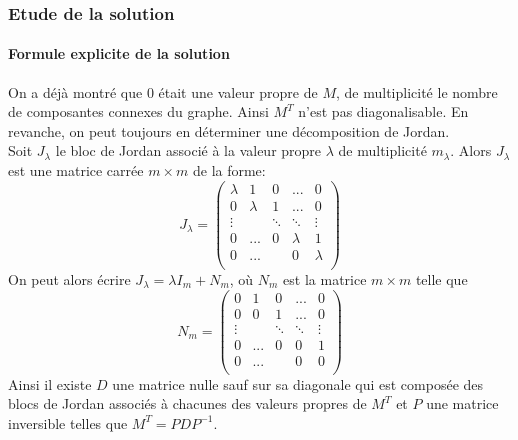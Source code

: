\documentclass[a4paper]{article}
\theoremstyle{plain}
\theoremstyle{definition}
\theoremstyle{remark}
\begin{document}
\subsubsection{Etude de la solution}
\paragraph{Formule explicite de la solution}
On a déjà montré que $0$ était une valeur propre de $M$, de multiplicité le nombre de composantes connexes du graphe. Ainsi $M^T$ n'est pas diagonalisable. En revanche, on peut toujours en déterminer une décomposition de Jordan.\\
Soit $J_\lambda$ le bloc de Jordan associé à la valeur propre $\lambda$ de multiplicité $m_\lambda$. Alors $J_\lambda$ est une matrice carrée $m\times m$ de la forme:
$$J_\lambda=\begin{pmatrix}
 \lambda& 1 &0& ... & 0\\
 0 & \lambda&1& ...&0\\
 \vdots&&\ddots&\ddots&\vdots\\
 0&...&0&\lambda&1\\
 0&...&&0&\lambda\\
\end{pmatrix}$$
On peut alors écrire $J_\lambda=\lambda I_m+N_m$, où $N_m$ est la matrice $m\times m$ telle que 
$$N_m=\begin{pmatrix}
 0& 1 &0& ... & 0\\
 0 & 0&1& ...&0\\
 \vdots&&\ddots&\ddots&\vdots\\
 0&...&0&0&1\\
 0&...&&0&0\\
\end{pmatrix}$$
Ainsi il existe $D$ une matrice nulle sauf sur sa diagonale qui est composée des blocs de Jordan associés à chacunes des valeurs propres de $M^T$ et $P$ une matrice inversible telles que $M^T=PDP^{-1}$.
\end{document}
